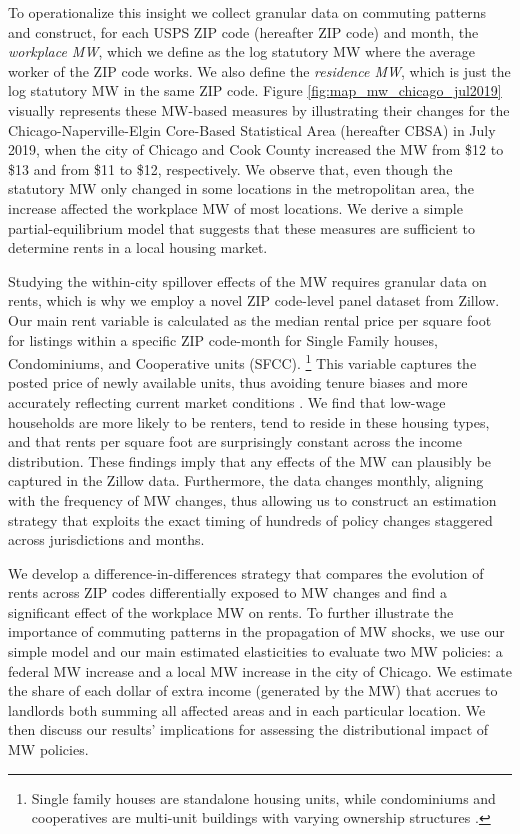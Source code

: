 To operationalize this insight we collect granular data on commuting patterns 
and construct, for each USPS ZIP code (hereafter ZIP code) and month,
the \textit{workplace MW}, which we define as the log statutory MW where
the average worker of the ZIP code works.
We also define the \textit{residence MW}, which is just the log statutory MW in 
the same ZIP code.
Figure \ref{fig:map_mw_chicago_jul2019} visually represents these MW-based 
measures by illustrating their changes for the Chicago-Naperville-Elgin 
Core-Based Statistical Area (hereafter CBSA) in July 2019,
when the city of Chicago and Cook County increased the MW from \$12 to \$13 and 
from \$11 to \$12, respectively.
We observe that, even though the statutory MW only changed in some locations in
the metropolitan area, the increase affected the workplace MW of most locations.
We derive a simple partial-equilibrium model that suggests that these 
measures are sufficient to determine rents in a local housing market.

Studying the within-city spillover effects of the MW requires granular data on 
rents, which is why we employ a novel ZIP code-level panel dataset from Zillow.
Our main rent variable is calculated as the median rental price per square foot 
for listings within a specific ZIP code-month for Single Family houses, 
Condominiums, and Cooperative units (SFCC).%
\footnote{Single family houses are standalone housing units, while condominiums 
    and cooperatives are multi-unit buildings with varying ownership structures 
    \parencite{ZillowTypesOfHomes}.}
This variable captures the posted price of newly available units, 
thus avoiding tenure biases and more accurately reflecting current market 
conditions \parencite{AmbroseEtAl2015}.
We find that low-wage households are more likely to be renters,
tend to reside in these housing types,
and that rents per square foot are surprisingly constant across the income 
distribution.
These findings imply that any effects of the MW can plausibly be captured 
in the Zillow data.
Furthermore, the data changes monthly, aligning with the frequency of MW 
changes, thus allowing us to construct an estimation strategy that exploits the 
exact timing of hundreds of policy changes staggered across jurisdictions and 
months.

We develop a difference-in-differences strategy that compares the evolution of 
rents across ZIP codes differentially exposed to MW changes and find a 
significant effect of the workplace MW on rents.
To further illustrate the importance of commuting patterns in the propagation 
of MW shocks, we use our simple model and our main estimated elasticities to 
evaluate two MW policies: 
a federal MW increase and
a local MW increase in the city of Chicago.
We estimate the share of each dollar of extra income (generated by the MW) that 
accrues to landlords both summing all affected areas and in each particular 
location.
We then discuss our results' implications for assessing the distributional 
impact of MW policies.

